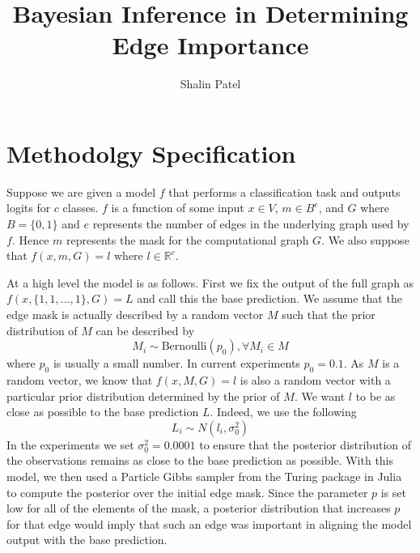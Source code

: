 \documentclass[11pt]{article}
\title{Bayesian Inference in Determining Edge Importance}
\author{Shalin Patel}
\begin{document}
\maketitle
\section{Methodolgy Specification}
Suppose we are given a model $f$ that performs a classification task and outputs logits for $c$ classes. $f$ is a function of some input $x \in V$, $m \in B^e$, and $G$ where $B = \{0, 1\}$ and $e$ represents the number of edges in the underlying graph used by $f$. Hence $m$ represents the mask for the computational graph $G$. We also suppose that $f(x, m, G) = l$ where $l \in \mathbb{R}^c$.

At a high level the model is as follows. First we fix the output of the full graph as $f(x, \{1, 1, \dots, 1\}, G) = L$ and call this the base prediction. We assume that the edge mask is actually described by a random vector $M$ such that the prior distribution of $M$ can be described by 
\[M_i \sim \text{Bernoulli}(p_0), \forall M_i \in M\]
where $p_0$ is usually a small number. In current experiments $p_0 = 0.1$. As $M$ is a random vector, we know that $f(x, M, G) = l$ is also a random vector with a particular prior distribution determined by the prior of $M$. We want $l$ to be as close as possible to the base prediction $L$. Indeed, we use the following
\[
L_i \sim N(l_i, \sigma_0^2)
\] 
In the experiments we set $\sigma_0^2 = 0.0001$ to ensure that the posterior distribution of the observations remains as close to the base prediction as possible. With this model, we then used a Particle Gibbs sampler from the Turing package in Julia to compute the posterior over the initial edge mask. Since the parameter $p$ is set low for all of the elements of the mask, a posterior distribution that increases $p$ for that edge would imply that such an edge was important in aligning the model output with the base prediction.
\end{document}
